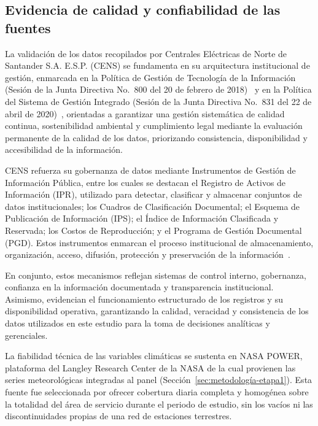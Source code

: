 \subsection{Evidencia de calidad y confiabilidad de las fuentes}
\label{sec:evidencia_calidad_fuentes}
    La validación de los datos recopilados por Centrales Eléctricas de Norte de Santander S.A. E.S.P. (CENS) se fundamenta en su arquitectura institucional de gestión, enmarcada en la Política de Gestión de Tecnología de la Información (Sesión de la Junta Directiva No.~800 del 20 de febrero de 2018)~\textcite{ref38} y en la Política del Sistema de Gestión Integrado (Sesión de la Junta Directiva No.~831 del 22 de abril de 2020)~\textcite{ref39}, orientadas a garantizar una gestión sistemática de calidad continua, sostenibilidad ambiental y cumplimiento legal mediante la evaluación permanente de la calidad de los datos, priorizando consistencia, disponibilidad y accesibilidad de la información.
    
    CENS refuerza su gobernanza de datos mediante Instrumentos de Gestión de Información Pública, entre los cuales se destacan el Registro de Activos de Información (IPR), utilizado para detectar, clasificar y almacenar conjuntos de datos institucionales; los Cuadros de Clasificación Documental; el Esquema de Publicación de Información (IPS); el Índice de Información Clasificada y Reservada; los Costos de Reproducción; y el Programa de Gestión Documental (PGD). Estos instrumentos enmarcan el proceso institucional de almacenamiento, organización, acceso, difusión, protección y preservación de la información~\textcite{ref40}.
    
    En conjunto, estos mecanismos reflejan sistemas de control interno, gobernanza, confianza en la información documentada y transparencia institucional. Asimismo, evidencian el funcionamiento estructurado de los registros y su disponibilidad operativa, garantizando la calidad, veracidad y consistencia de los datos utilizados en este estudio para la toma de decisiones analíticas y gerenciales.
    
    La fiabilidad técnica de las variables climáticas se sustenta en NASA POWER, plataforma del Langley Research Center de la NASA de la cual provienen las series meteorológicas integradas al panel (Sección~\ref{sec:metodología-etapa1}). Esta fuente fue seleccionada por ofrecer cobertura diaria completa y homogénea sobre la totalidad del área de servicio durante el periodo de estudio, sin los vacíos ni las discontinuidades propias de una red de estaciones terrestres.
    

